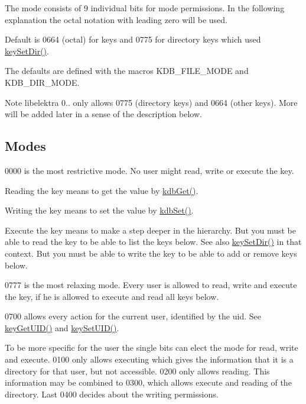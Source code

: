 The mode consists of 9 individual bits for mode permissions. In the following explanation the octal notation with leading zero will be used.

Default is 0664 (octal) for keys and 0775 for directory keys which used \mbox{\hyperlink{group__meta_gaae575bd86a628a15ee45baa860522e75}{key\+Set\+Dir()}}.

The defaults are defined with the macros K\+D\+B\+\_\+\+F\+I\+L\+E\+\_\+\+M\+O\+DE and K\+D\+B\+\_\+\+D\+I\+R\+\_\+\+M\+O\+DE.

\begin{DoxyNote}{Note}
libelektra 0.. only allows 0775 (directory keys) and 0664 (other keys). More will be added later in a sense of the description below.
\end{DoxyNote}
\hypertarget{group__meta_mode}{}\subsection{Modes}\label{group__meta_mode}
0000 is the most restrictive mode. No user might read, write or execute the key.

Reading the key means to get the value by \mbox{\hyperlink{group__kdb_ga28e385fd9cb7ccfe0b2f1ed2f62453a1}{kdb\+Get()}}.

Writing the key means to set the value by \mbox{\hyperlink{group__kdb_ga11436b058408f83d303ca5e996832bcf}{kdb\+Set()}}.

Execute the key means to make a step deeper in the hierarchy. But you must be able to read the key to be able to list the keys below. See also \mbox{\hyperlink{group__meta_gaae575bd86a628a15ee45baa860522e75}{key\+Set\+Dir()}} in that context. But you must be able to write the key to be able to add or remove keys below.

0777 is the most relaxing mode. Every user is allowed to read, write and execute the key, if he is allowed to execute and read all keys below.

0700 allows every action for the current user, identified by the uid. See \mbox{\hyperlink{group__meta_gacaa5060e67b03f50ae49a3620c54bc46}{key\+Get\+U\+I\+D()}} and \mbox{\hyperlink{group__meta_gab5f284f5ecd261e0a290095f50ba1af7}{key\+Set\+U\+I\+D()}}.

To be more specific for the user the single bits can elect the mode for read, write and execute. 0100 only allows executing which gives the information that it is a directory for that user, but not accessible. 0200 only allows reading. This information may be combined to 0300, which allows execute and reading of the directory. Last 0400 decides about the writing permissions.

